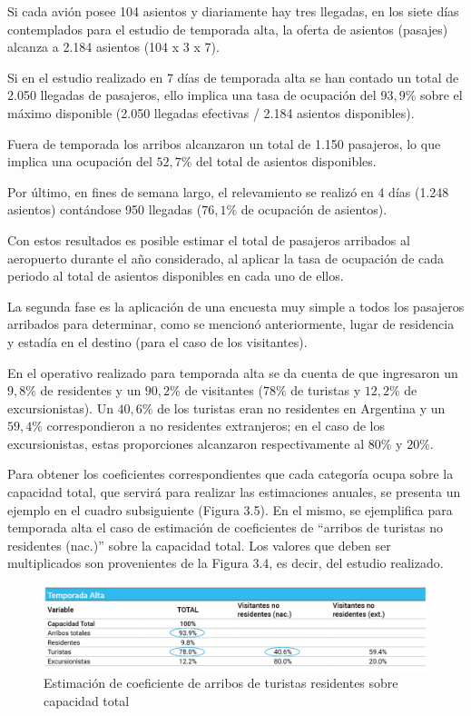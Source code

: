 \documentclass[
]{book}
\begin{document}
Si cada avión posee 104 asientos y diariamente hay tres llegadas, en los siete días contemplados para el estudio de temporada alta, la oferta de asientos (pasajes) alcanza a 2.184 asientos (104 x 3 x 7).

Si en el estudio realizado en 7 días de temporada alta se han contado un total de 2.050 llegadas de pasajeros, ello implica una tasa de ocupación del \(93,9\%\) sobre el máximo disponible (2.050 llegadas efectivas / 2.184 asientos disponibles).

Fuera de temporada los arribos alcanzaron un total de 1.150 pasajeros, lo que implica una ocupación del \(52,7\%\) del total de asientos disponibles.

Por último, en fines de semana largo, el relevamiento se realizó en 4 días (1.248 asientos) contándose 950 llegadas (\(76,1\%\) de ocupación de asientos).

Con estos resultados es posible estimar el total de pasajeros arribados al aeropuerto durante el año considerado, al aplicar la tasa de ocupación de cada periodo al total de asientos disponibles en cada uno de ellos.

La segunda fase es la aplicación de una encuesta muy simple a todos los pasajeros arribados para determinar, como se mencionó anteriormente, lugar de residencia y estadía en el destino (para el caso de los visitantes).

En el operativo realizado para temporada alta se da cuenta de que ingresaron un \(9,8\%\) de residentes y un \(90,2\%\) de visitantes (\(78\%\) de turistas y \(12,2\%\) de excursionistas). Un \(40,6\%\) de los turistas eran no residentes en Argentina y un \(59,4\%\) correspondieron a no residentes extranjeros; en el caso de los excursionistas, estas proporciones alcanzaron respectivamente al \(80\%\) y \(20\%\).

Para obtener los coeficientes correspondientes que cada categoría ocupa sobre la capacidad total, que servirá para realizar las estimaciones anuales, se presenta un ejemplo en el cuadro subsiguiente (Figura 3.5). En el mismo, se ejemplifica para temporada alta el caso de estimación de coeficientes de ``arribos de turistas no residentes (nac.)'' sobre la capacidad total. Los valores que deben ser multiplicados son provenientes de la Figura 3.4, es decir, del estudio realizado.

\begin{figure}

{\centering \includegraphics[width=1\linewidth]{imagenes/figura07} 

}

\caption{Estimación de coeficiente de arribos de turistas residentes sobre capacidad total}\label{fig:arribosdeturistas}
\end{figure}
\end{document}
